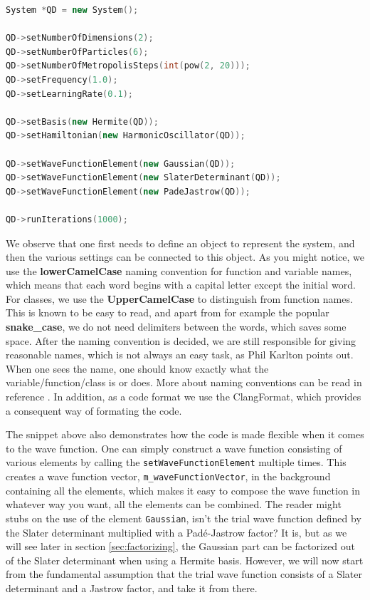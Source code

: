 \begin{lstlisting}[language={C++}, caption={Example on how a quantum dot system can be initialized.}, label={lst:qd}]
System *QD = new System();

QD->setNumberOfDimensions(2);
QD->setNumberOfParticles(6);
QD->setNumberOfMetropolisSteps(int(pow(2, 20)));
QD->setFrequency(1.0);
QD->setLearningRate(0.1);

QD->setBasis(new Hermite(QD));
QD->setHamiltonian(new HarmonicOscillator(QD));

QD->setWaveFunctionElement(new Gaussian(QD));
QD->setWaveFunctionElement(new SlaterDeterminant(QD));
QD->setWaveFunctionElement(new PadeJastrow(QD));

QD->runIterations(1000);
\end{lstlisting}
We observe that one first needs to define an object to represent the system, and then the various settings can be connected to this object. As you might notice, we use the \textbf{lowerCamelCase} naming convention for function and variable names, which means that each word begins with a capital letter except the initial word. For classes, we use the \textbf{UpperCamelCase} to distinguish from function names. This is known to be easy to read, and apart from for example the popular \textbf{snake\_case}, we do not need delimiters between the words, which saves some space. After the naming convention is decided, we are still responsible for giving reasonable names, which is not always an easy task, as Phil Karlton points out. When one sees the name, one should know exactly what the variable/function/class is or does. More about naming conventions can be read in reference \cite{noauthor_naming_2019}. In addition, as a code format we use the ClangFormat, which provides a consequent way of formating the code. 

The snippet above also demonstrates how the code is made flexible when it comes to the wave function. One can simply construct a wave function consisting of various elements by calling the \lstinline{setWaveFunctionElement} multiple times. This creates a wave function vector, \lstinline{m_waveFunctionVector}, in the background containing all the elements, which makes it easy to compose the wave function in whatever way you want, all the elements can be combined. The reader might stubs on the use of the element \lstinline{Gaussian}, isn't the trial wave function defined by the Slater determinant multiplied with a Padé-Jastrow factor? It is, but as we will see later in section \ref{sec:factorizing}, the Gaussian part can be factorized out of the Slater determinant when using a Hermite basis. However, we will now start from the fundamental assumption that the trial wave function consists of a Slater determinant and a Jastrow factor, and take it from there. 

